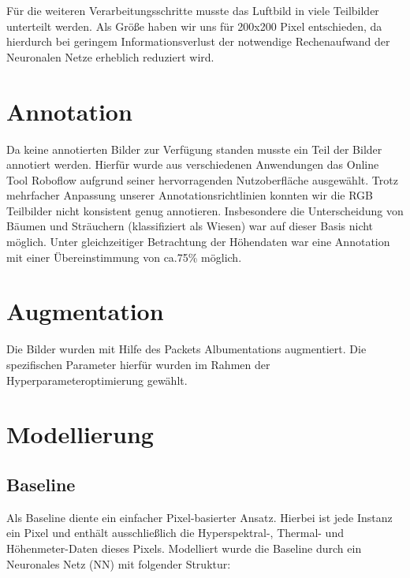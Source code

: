 Für die weiteren Verarbeitungsschritte musste das Luftbild in viele Teilbilder unterteilt werden.
Als Größe haben wir uns für 200x200 Pixel entschieden, da hierdurch bei geringem Informationsverlust der notwendige Rechenaufwand der Neuronalen Netze erheblich reduziert wird.


\section{Annotation}
Da keine annotierten Bilder zur Verfügung standen musste ein Teil der Bilder annotiert werden.
Hierfür wurde aus verschiedenen Anwendungen das Online Tool Roboflow aufgrund seiner hervorragenden Nutzoberfläche ausgewählt.
Trotz mehrfacher Anpassung unserer Annotationsrichtlinien konnten wir die RGB Teilbilder nicht konsistent genug annotieren.
Insbesondere die Unterscheidung von Bäumen und Sträuchern (klassifiziert als Wiesen) war auf dieser Basis nicht möglich.
Unter gleichzeitiger Betrachtung der Höhendaten war eine Annotation mit einer Übereinstimmung von ca.75\% möglich.

\section{Augmentation}
Die Bilder wurden mit Hilfe des Packets Albumentations augmentiert.
Die spezifischen Parameter hierfür wurden im Rahmen der Hyperparameteroptimierung gewählt.

\section{Modellierung}

\subsection{Baseline}
Als Baseline diente ein einfacher Pixel-basierter Ansatz.
Hierbei ist jede Instanz ein Pixel und enthält ausschließlich die Hyperspektral-, Thermal- und Höhenmeter-Daten dieses Pixels.
Modelliert wurde die Baseline durch ein Neuronales Netz (NN) mit folgender Struktur:

